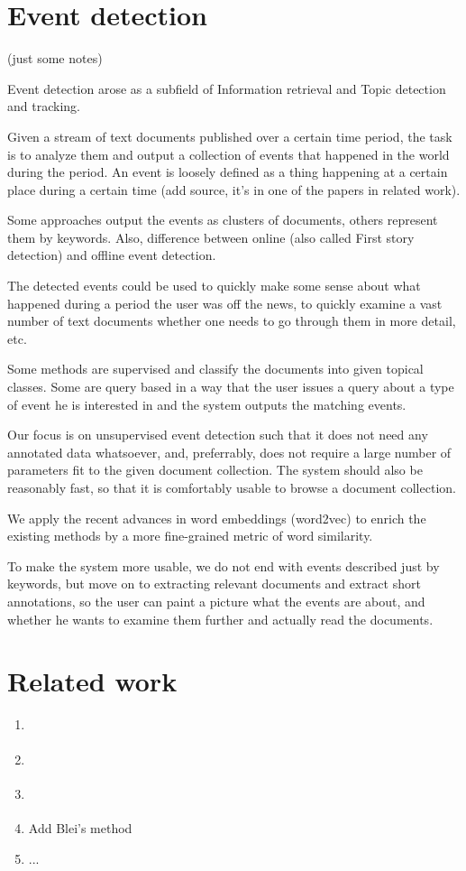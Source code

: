 \section{Event detection}
(just some notes)

Event detection arose as a subfield of Information retrieval and Topic detection and tracking.

Given a stream of text documents published over a certain time period, the task is to analyze them and output a collection of events that happened in the world during the period. An event is loosely defined as a thing happening at a certain place during a certain time (add source, it's in one of the papers in related work).

Some approaches output the events as clusters of documents, others represent them by keywords. Also, difference between online (also called First story detection) and offline event detection.

The detected events could be used to quickly make some sense about what happened during a period the user was off the news, to quickly examine a vast number of text documents whether one needs to go through them in more detail, etc.

Some methods are supervised and classify the documents into given topical classes. Some are query based in a way that the user issues a query about a type of event he is interested in and the system outputs the matching events.

Our focus is on unsupervised event detection such that it does not need any annotated data whatsoever, and, preferrably, does not require a large number of parameters fit to the given document collection. The system should also be reasonably fast, so that it is comfortably usable to browse a document collection.

We apply the recent advances in word embeddings (word2vec) to enrich the existing methods by a more fine-grained metric of word similarity.

To make the system more usable, we do not end with events described just by keywords, but move on to extracting relevant documents and extract short annotations, so the user can paint a picture what the events are about, and whether he wants to examine them further and actually read the documents.

\section{Related work}
\begin{enumerate}
\item \cite{event-detection}
\item \cite{parameter-free}
\item \cite{retrospective-online-study}
\item Add Blei's method
\item ...

\end{enumerate}